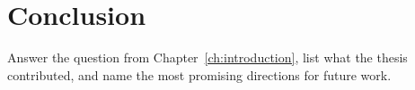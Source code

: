 \chapter{Conclusion}
\label{ch:conclusion}

Answer the question from Chapter~\ref{ch:introduction}, list what the thesis
contributed, and name the most promising directions for future work.
